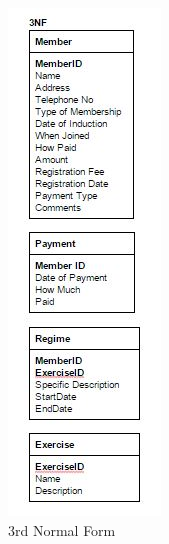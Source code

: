 \begin{itemize}
\begin{figure}[H]
    \includegraphics[width=\textwidth]{Norm4.JPG}
    \caption{3rd Normal Form} \label{fig: 3rd Normal Form}
\end{figure}


\end{itemize}
